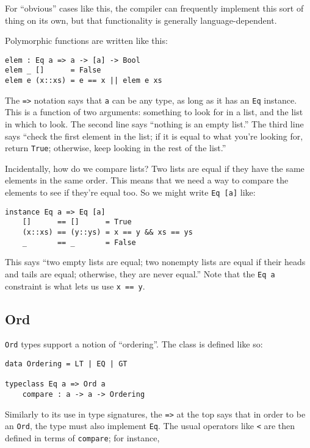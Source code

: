 \documentclass{book}
\newcommand{\mlil}[1]{\lstinline[language=pseudoml,columns=fixed]|#1|}\usepackage{caption}
\begin{document}
\noindent For ``obvious'' cases like this, the compiler can frequently implement this sort of thing on its own, but that functionality is generally language-dependent.

Polymorphic functions are written like this:

\begin{lstlisting}[language=pseudoml]
elem : Eq a => a -> [a] -> Bool
elem _ []      = False
elem e (x::xs) = e == x || elem e xs
\end{lstlisting}

The \mlil{=>} notation says that \mlil{a} can be any type, as long as it has an \mlil{Eq} instance. This is a function of two arguments: something to look for in a list, and the list in which to look. The second line says ``nothing is an empty list.'' The third line says ``check the first element in the list; if it is equal to what you're looking for, return \mlil{True}; otherwise, keep looking in the rest of the list.''

Incidentally, how do we compare lists? Two lists are equal if they have the same elements in the same order. This means that we need a way to compare the elements to see if they're equal too. So we might write \mlil{Eq [a]} like:

\begin{lstlisting}[language=pseudoml]
instance Eq a => Eq [a]
    []      == []      = True
    (x::xs) == (y::ys) = x == y && xs == ys
    _       == _       = False
\end{lstlisting}

\noindent This says ``two empty lists are equal; two nonempty lists are equal if their heads and tails are equal; otherwise, they are never equal.'' Note that the \mlil{Eq a} constraint is what lets us use \mlil{x == y}.

\subsection{Ord}

\mlil{Ord} types support a notion of ``ordering''. The class is defined like so:

\begin{lstlisting}[language=pseudoml]
data Ordering = LT | EQ | GT

typeclass Eq a => Ord a
    compare : a -> a -> Ordering
\end{lstlisting}

Similarly to its use in type signatures, the \mlil{=>} at the top says that in order to be an \mlil{Ord}, the type must also implement \mlil{Eq}. The usual operators like \mlil{<} are then defined in terms of \mlil{compare}; for instance,
\end{document}
